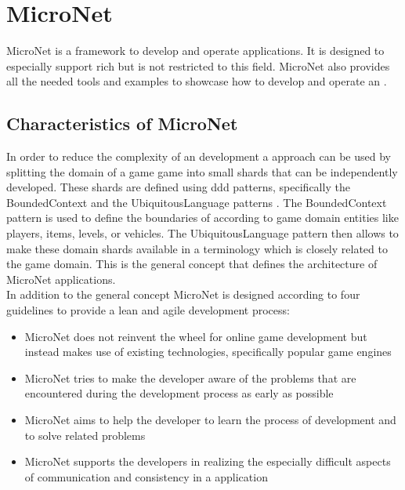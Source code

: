 \section{MicroNet}

MicroNet is a framework to develop and operate \ms{} applications. It is
designed to especially support rich \ogs{} but is not restricted to this
field. MicroNet also provides all the needed tools and examples to showcase how
to develop and operate an \og{}.

\subsection{Characteristics of MicroNet}

In order to reduce the complexity of an \og{} development a \ms{} approach can
be used by splitting the domain of a game game into small shards that can be
independently developed. These shards are defined using 
\gls{ddd} patterns, specifically the BoundedContext and the UbiquitousLanguage
patterns \cite{fowler2003-2016ddd}. The BoundedContext pattern is used to define
the boundaries of \mss{} according to game domain entities like players, items,
levels, or vehicles. The UbiquitousLanguage pattern then allows to make these
domain shards available in a terminology which is closely related to the game
domain. This is the general concept that defines the architecture of MicroNet
applications.\\

In addition to the general concept MicroNet is designed according to four
guidelines to provide a lean and agile \og{} development process:
\begin{itemize}
  \item MicroNet does not reinvent the wheel for online game development but
  instead makes use of existing technologies, specifically popular game engines
  \item MicroNet tries to make the developer aware of the problems that are
  encountered during the development process as early as possible
  \item MicroNet aims to help the developer to learn the process of \og{}
  development and to solve related problems
  \item MicroNet supports the developers in realizing the especially
  difficult aspects of communication and consistency in a \ms{} application
\end{itemize}








 

